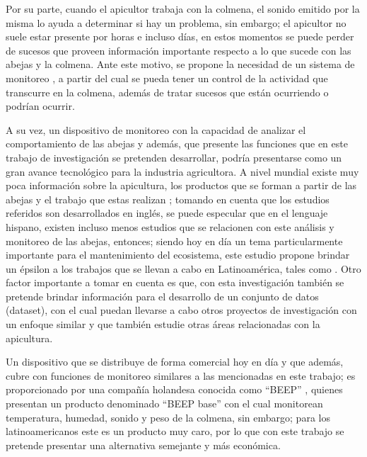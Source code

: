 \documentclass[12pt]{report}
\begin{document}
	\par Por su parte, cuando el apicultor trabaja con la colmena, el sonido emitido por la misma lo ayuda a determinar si hay un problema, sin embargo; el apicultor no suele estar presente por horas e incluso días, en estos momentos se puede perder de sucesos que proveen información importante respecto a lo que sucede con las abejas y la colmena. Ante este motivo, se propone la necesidad de un sistema de monitoreo \cite{zlatkova2020honeybees}, a partir del cual se pueda tener un control de la actividad que transcurre en la colmena, además de tratar sucesos que están ocurriendo o podrían ocurrir.
	
	\par A su vez, un dispositivo de monitoreo con la capacidad de analizar el comportamiento de las abejas y además, que presente las funciones que en este trabajo de investigación se pretenden desarrollar, podría presentarse como un gran avance tecnológico para la industria agricultora. A nivel mundial existe muy poca información sobre la apicultura, los productos que se forman a partir de las abejas y el trabajo que estas realizan \cite{cecchi2020smart}; tomando en cuenta que los estudios referidos son desarrollados en inglés, se puede especular que en el lenguaje hispano, existen incluso menos estudios que se relacionen con este análisis y monitoreo de las abejas, entonces; siendo hoy en día un tema particularmente importante para el mantenimiento del ecosistema, este estudio propone brindar un épsilon a los trabajos que se llevan a cabo en Latinoamérica, tales como \cite{echavarria2022sistema, galvani2022monitoreo}. Otro factor importante a tomar en cuenta es que, con esta investigación también se pretende brindar información para el desarrollo de un conjunto de datos (dataset), con el cual puedan llevarse a cabo otros proyectos de investigación con un enfoque similar y que también estudie otras áreas relacionadas con la apicultura.
	
	\par Un dispositivo que se distribuye de forma comercial hoy en día y que además, cubre con funciones de monitoreo similares a las mencionadas en este trabajo; es proporcionado por una compañía holandesa conocida como ``BEEP'' \cite{beep_company}, quienes presentan un producto denominado ``BEEP base'' con el cual monitorean temperatura, humedad, sonido y peso de la colmena, sin embargo; para los latinoamericanos este es un producto muy caro, por lo que con este trabajo se pretende presentar una alternativa semejante y más económica.
	
\end{document}
